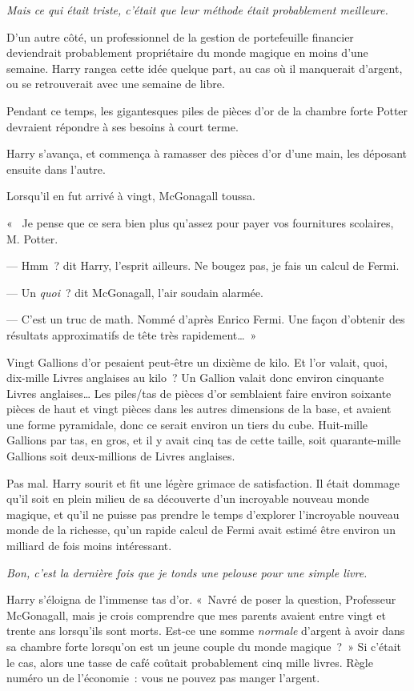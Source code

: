 \emph{Mais ce qui était triste, c'était que leur méthode était probablement meilleure.}

D'un autre côté, un professionnel de la gestion de portefeuille financier deviendrait probablement propriétaire du monde magique en moins d'une semaine. Harry rangea cette idée quelque part, au cas où il manquerait d'argent, ou se retrouverait avec une semaine de libre.

Pendant ce temps, les gigantesques piles de pièces d'or de la chambre forte Potter devraient répondre à ses besoins à court terme.

Harry s'avança, et commença à ramasser des pièces d'or d'une main, les déposant ensuite dans l'autre.

Lorsqu'il en fut arrivé à vingt, McGonagall toussa.

«~ Je pense que ce sera bien plus qu'assez pour payer vos fournitures scolaires, M. Potter.

--- Hmm~? dit Harry, l'esprit ailleurs. Ne bougez pas, je fais un calcul de Fermi.

--- Un \emph{quoi}~? dit McGonagall, l'air soudain alarmée.

--- C'est un truc de math. Nommé d'après Enrico Fermi. Une façon d'obtenir des résultats approximatifs de tête très rapidement…~»

Vingt Gallions d'or pesaient peut-être un dixième de kilo. Et l'or valait, quoi, dix-mille Livres anglaises au kilo~? Un Gallion valait donc environ cinquante Livres anglaises… Les piles/tas de pièces d'or semblaient faire environ soixante pièces de haut et vingt pièces dans les autres dimensions de la base, et avaient une forme pyramidale, donc ce serait environ un tiers du cube. Huit-mille Gallions par tas, en gros, et il y avait cinq tas de cette taille, soit quarante-mille Gallions soit deux-millions de Livres anglaises.

Pas mal. Harry sourit et fit une légère grimace de satisfaction. Il était dommage qu'il soit en plein milieu de sa découverte d'un incroyable nouveau monde magique, et qu'il ne puisse pas prendre le temps d'explorer l'incroyable nouveau monde de la richesse, qu'un rapide calcul de Fermi avait estimé être environ un milliard de fois moins intéressant.

\emph{Bon, c'est la dernière fois que je tonds une pelouse pour une simple livre.}

Harry s'éloigna de l'immense tas d'or. «~Navré de poser la question, Professeur McGonagall, mais je crois comprendre que mes parents avaient entre vingt et trente ans lorsqu'ils sont morts. Est-ce une somme \emph{normale} d'argent à avoir dans sa chambre forte lorsqu'on est un jeune couple du monde magique~?~» Si c'était le cas, alors une tasse de café coûtait probablement cinq mille livres. Règle numéro un de l'économie~: vous ne pouvez pas manger l'argent.

